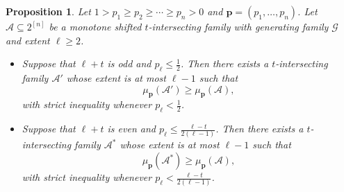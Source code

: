 \documentclass[11pt]{article}
\newtheorem{prop}[theorem]{Proposition}
\begin{document}
\begin{prop}\label{pr3}
Let $1 > p_1 \ge p_2 \ge \cdots \ge p_n > 0$ and $\mathbf{p} = (p_1, \dots, p_n)$.
Let $\mathcal{A}\subseteq 2^{[n]}$ be a monotone shifted $t$-intersecting family with  generating family  $\mathcal{G}$ and extent $\ell \geq 2$. 
\begin{itemize}

\item[(1)] Suppose that $\ell+t$ is odd and  $p_{\ell}\leq\frac{1}{2}$. 
Then there exists a $t$-intersecting family $\mathcal{A}'$ whose extent is at most $\ell-1$ such that 
$$
\mu_{\mathbf{p}}(\mathcal{A}')\geq \mu_{\mathbf{p}}(\mathcal{A}),
$$
with strict inequality  whenever $p_{\ell}<\frac{1}{2}$.

\item[(2)] Suppose that $\ell+t$ is even and  $p_{\ell}\leq\frac{\ell-t}{2(\ell-1)}$. 
Then there exists a $t$-intersecting family $\mathcal{A}^*$ whose extent is at most $\ell-1$ such that 
$$
\mu_{\mathbf{p}}(\mathcal{A}^*)\geq \mu_{\mathbf{p}}(\mathcal{A}),
$$
with strict inequality  whenever $p_{\ell}<\frac{\ell-t}{2(\ell-1)}$.
\end{itemize}
\end{prop}
\end{document}
